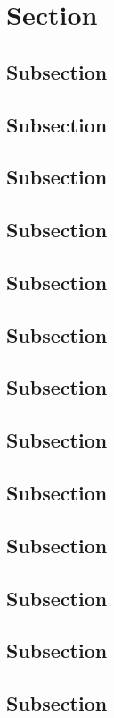 \documentclass[paper=a5,twoside,fontsize=10pt, DIV=calc, headings=small, bibliography=totoc, listof=totoc]{scrbook}
\theoremstyle{break}
\begin{document}
\section{Section}

\subsection{Subsection}
\label{ssec:example}
\blindtext

\subsection{Subsection}
\subsection{Subsection}
\subsection{Subsection}
\subsection{Subsection}
\subsection{Subsection}
\subsection{Subsection}
\subsection{Subsection}
\subsection{Subsection}
\subsection{Subsection}
\subsection{Subsection}
\subsection{Subsection}
\subsection{Subsection}
\end{document}

